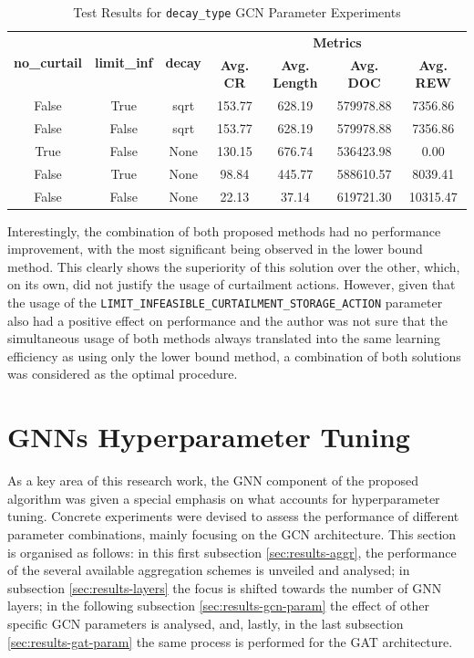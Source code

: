 \begin{table}[h!]
	\centering
	\caption{Test Results for \texttt{decay\_type} \ac{GCN} Parameter Experiments}
	\begin{tabular}{ccccccc}
		\toprule
		\multirow{2}{*}{\textbf{no\_curtail}} & \multirow{2}{*}{\textbf{limit\_inf}} & \multirow{2}{*}{\textbf{decay}} & \multicolumn{4}{c}{\textbf{Metrics}} \\ 
		\cmidrule(lr){4-7}
		&  & & \textbf{Avg. CR} & \textbf{Avg. Length} & \textbf{Avg. DOC} & \textbf{Avg. REW} \\ 
		\midrule
		False & True & sqrt & 153.77 & 628.19 & 579978.88 & 7356.86 \\
		False & False & sqrt & 153.77 & 628.19 & 579978.88 & 7356.86 \\
		True & False & None & 130.15 & 676.74 & 536423.98 & 0.00 \\
		False & True & None & 98.84 & 445.77 & 588610.57 & 8039.41 \\
		False & False & None &  22.13 & 37.14 & 619721.30 & 10315.47 \\
		
		\bottomrule
	\end{tabular}
	\label{tab:test-curtail-comp}
\end{table}


Interestingly, the combination of both proposed methods had no performance improvement, with the most significant being observed in the lower bound method. This clearly shows the superiority of this solution over the other, which, on its own, did not justify the usage of curtailment actions. However, given that the usage of the \texttt{LIMIT\_INFEASIBLE\_CURTAILMENT\_STORAGE\_ACTION} parameter also had a positive effect on performance and the author was not sure that the simultaneous usage of both methods always translated into the same learning efficiency as using only the lower bound method, a combination of both solutions was considered as the optimal procedure.

\section{\acp{GNN} Hyperparameter Tuning} \label{sec:results-gnn}

As a key area of this research work, the \ac{GNN} component of the proposed algorithm was given a special emphasis on what accounts for hyperparameter tuning. Concrete experiments were devised to assess the performance of different parameter combinations, mainly focusing on the \ac{GCN} architecture. This section is organised as follows: in this first subsection \ref{sec:results-aggr}, the performance of the several available aggregation schemes is unveiled and analysed; in subsection \ref{sec:results-layers} the focus is shifted towards the number of \ac{GNN} layers; in the following subsection \ref{sec:results-gcn-param} the effect of other specific \ac{GCN} parameters is analysed, and, lastly, in the last subsection \ref{sec:results-gat-param} the same process is performed for the \ac{GAT} architecture. \par 



